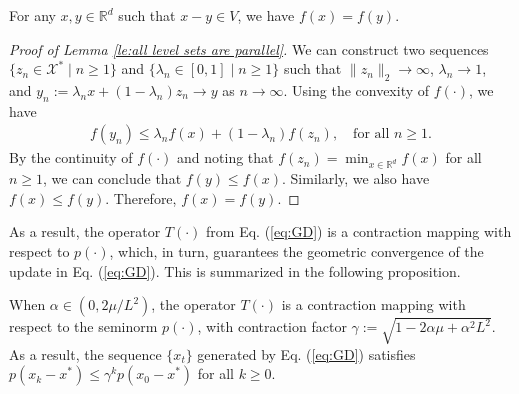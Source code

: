 \documentclass[11 pt]{article}
\begin{document}
	\begin{lemma}\label{le:all level sets are parallel}
		For any $x, y \in \mathbb{R}^d$ such that $x - y \in V$, we have $f(x) = f(y)$.
	\end{lemma}
	\begin{proof}[Proof of Lemma \ref{le:all level sets are parallel}]
		We can construct two sequences $\{z_n \in \mathcal{X}^* \mid n \geq 1\}$ and $\{\lambda_n \in [0, 1] \mid n \geq 1\}$ such that $\|z_n\|_2 \rightarrow \infty$, $\lambda_n \rightarrow 1$, and $y_n := \lambda_n x + (1 - \lambda_n) z_n \rightarrow y$ as $n \rightarrow \infty$. Using the convexity of $f(\cdot)$, we have
		\begin{align*}
			f(y_n) \leq \lambda_n f(x) + (1 - \lambda_n) f(z_n), \quad \text{for all } n \geq 1.
		\end{align*}
		By the continuity of $f(\cdot)$ and noting that $f(z_n) = \min_{x \in \mathbb{R}^d} f(x)$ for all $n \geq 1$, we can conclude that $f(y) \leq f(x)$. Similarly, we also have $f(x) \leq f(y)$. Therefore, $f(x) = f(y)$.\end{proof}
	
	As a result, the operator $T(\cdot)$ from Eq. (\ref{eq:GD}) is a contraction mapping with respect to $p(\cdot)$, which, in turn, guarantees the geometric convergence of the update in Eq. (\ref{eq:GD}). This is summarized in the following proposition.
	
	\begin{proposition}\label{le:seminorm_optimization}
		When $\alpha\in (0,2\mu/L^2)$, the operator $T(\cdot)$ is a contraction mapping with respect to the seminorm $p(\cdot)$, with contraction factor  $\gamma:=\sqrt{1 - 2\alpha \mu + \alpha^2 L^2}$. As a result, the sequence $\{x_t\}$ generated by Eq. (\ref{eq:GD}) satisfies $p(x_k-x^*)\leq \gamma^kp(x_0-x^*)$ for all $k\geq 0$.
	\end{proposition}
	
\end{document}
